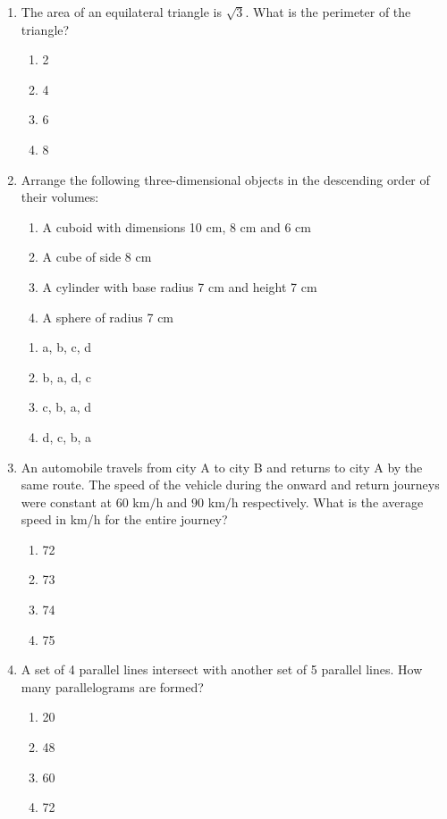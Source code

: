 \documentclass[journal,12pt,onecolumn]{IEEEtran}
\theoremstyle{remark}
\begin{document}
\begin{enumerate}
    \item The area of an equilateral triangle is $\sqrt{3}$. What is the perimeter of the triangle?
    \hfill{} \begin{enumerate}
        \item 2
        \item 4
        \item 6
        \item 8
    \end{enumerate}

    \item Arrange the following three-dimensional objects in the descending order of their volumes:
    \hfill{} \begin{enumerate}
        \item A cuboid with dimensions 10 cm, 8 cm and 6 cm
        \item A cube of side 8 cm
        \item A cylinder with base radius 7 cm and height 7 cm
        \item A sphere of radius 7 cm
    \end{enumerate}
    \hfill{} \begin{enumerate}
        \item a, b, c, d
        \item b, a, d, c
        \item c, b, a, d
        \item d, c, b, a
    \end{enumerate}

    \item An automobile travels from city A to city B and returns to city A by the same route. The speed of the vehicle during the onward and return journeys were constant at $60 \text{ km/h}$ and $90 \text{ km/h}$ respectively. What is the average speed in km/h for the entire journey?
    \hfill{} \begin{enumerate}
        \item 72
        \item 73
        \item 74
        \item 75
    \end{enumerate}

    \item A set of 4 parallel lines intersect with another set of 5 parallel lines. How many parallelograms are formed?
    \hfill{} \begin{enumerate}
        \item 20
        \item 48
        \item 60
        \item 72
    \end{enumerate}


\end{enumerate}
\end{document}
